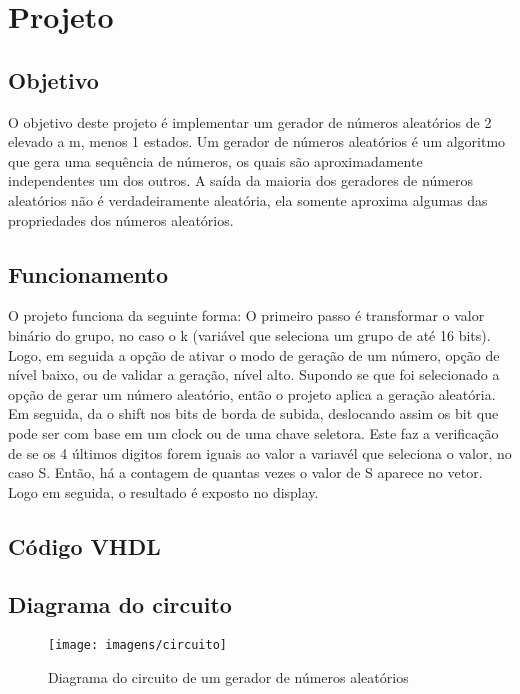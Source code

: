 \documentclass[12pts]{article}
\begin{document}
\section{Projeto}
\iffalse
Parte Experimental, descrevendo os passos realizados, dificuldades e soluções para os problemas encontrados. Aqui, deve-se apresentar uma descrição dos resultados encontrados em forma de figuras, gráficos e tabelas.
\fi

\singlespacing

\subsection{Objetivo}
	O objetivo deste projeto é implementar um gerador de números aleatórios de 2 elevado a m, menos 1 estados. Um gerador de números aleatórios é um algoritmo que gera uma sequência de números, os quais são aproximadamente independentes um dos outros. A saída da maioria dos geradores de números
aleatórios não é verdadeiramente aleatória, ela somente aproxima algumas das propriedades dos
números aleatórios.
		
\subsection{Funcionamento}
	O projeto funciona da seguinte forma: O primeiro passo é transformar o valor binário do grupo, no caso o k (variável que seleciona um grupo de até 16 bits). Logo, em seguida a opção de ativar o modo de geração de um número, opção de nível baixo, ou de validar a geração, nível alto. Supondo se que foi selecionado a opção de gerar um número aleatório, então o projeto aplica a geração aleatória. Em seguida, da o shift nos bits de borda de subida, deslocando assim os bit que pode ser com base em um clock ou de uma chave seletora. Este faz a verificação de se os 4 últimos digitos forem iguais ao valor a variavél que seleciona o valor, no caso S. Então, há a contagem de quantas vezes o valor de S aparece no vetor. Logo em seguida, o resultado é exposto no display.

\clearpage
\subsection{Código VHDL}


\clearpage
\subsection{Diagrama do circuito}
\begin{figure}[!htb]
  \centering
  \texttt{[image: imagens/circuito]}
  \caption{Diagrama do circuito de um gerador de números aleatórios}	
  \label{figRotulo}
\end{figure}
\end{document}
